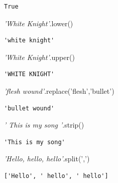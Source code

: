 \documentclass[
  letterpaper,
]{scrbook}
\newenvironment{Shaded}{\begin{snugshade}}{\end{snugshade}}
\newcommand{\CommentTok}[1]{\textcolor[rgb]{0.56,0.35,0.01}{\textit{#1}}}
\newcommand{\NormalTok}[1]{#1}
\newcommand{\StringTok}[1]{\textcolor[rgb]{0.31,0.60,0.02}{#1}}
\begin{document}
\begin{verbatim}
True
\end{verbatim}

\begin{Shaded}
\begin{Highlighting}[]
\CommentTok{'White Knight'}\NormalTok{.lower()}
\end{Highlighting}
\end{Shaded}

\begin{verbatim}
'white knight'
\end{verbatim}

\begin{Shaded}
\begin{Highlighting}[]
\CommentTok{'White Knight'}\NormalTok{.upper()}
\end{Highlighting}
\end{Shaded}

\begin{verbatim}
'WHITE KNIGHT'
\end{verbatim}

\begin{Shaded}
\begin{Highlighting}[]
\CommentTok{'flesh wound'}\NormalTok{.replace(}\StringTok{'flesh'}\NormalTok{,}\StringTok{'bullet'}\NormalTok{)}
\end{Highlighting}
\end{Shaded}

\begin{verbatim}
'bullet wound'
\end{verbatim}

\begin{Shaded}
\begin{Highlighting}[]
\CommentTok{' This is my song   '}\NormalTok{.strip()}
\end{Highlighting}
\end{Shaded}

\begin{verbatim}
'This is my song'
\end{verbatim}

\begin{Shaded}
\begin{Highlighting}[]
\CommentTok{'Hello, hello, hello'}\NormalTok{.split(}\StringTok{','}\NormalTok{)}
\end{Highlighting}
\end{Shaded}

\begin{verbatim}
['Hello', ' hello', ' hello']
\end{verbatim}
\end{document}

